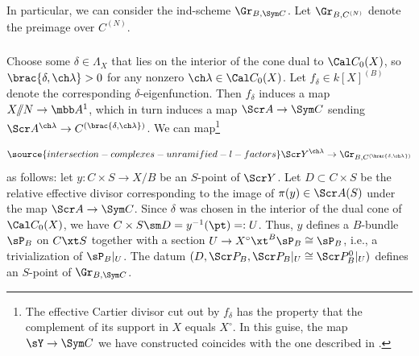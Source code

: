 In particular, we can consider the ind-scheme
$\Gr_{B,\Sym C}$. Let
$\Gr_{B,C^{(N)}}$ denote the preimage over $C^{(N)}$.

\subsubsection{} \label{sss:YGr}
Choose some $\delta \in \Lambda_X$ that lies on the interior of the
cone dual to $\Cal C_0(X)$, so $\brac{\delta,\ch\lambda}>0$
for any nonzero $\ch\lambda \in \Cal C_0(X)$.
Let $f_\delta \in k[X]^{(B)}$ denote the corresponding $\delta$-eigenfunction.
Then $f_\delta$ induces a map $X/\!\!/N \to \mbb A^1$, which
in turn induces a map $\Scr A \to \Sym C$ sending
$\Scr A^{\ch\lambda} \to C^{(\brac{\delta,\ch\lambda})}$.
We can map\footnote{
The effective Cartier divisor cut out by $f_\delta$
has the property that the complement of its support in $X$ equals $X^\circ$.
In this guise, the map $\sY \to \Sym C$ we have constructed coincides with
the one described in \cite[Remark 4.2.6]{Drinfeld}.}

\begin{equation} \label{e:YGr}
\source{intersection-complexes-unramified-l-factors}
    \Scr Y^{\ch\lambda} \to \Gr_{B,C^{(\brac{\delta,\ch\lambda})}}
\end{equation}
as follows:
let $y : C\times S \to X/B$ be an $S$-point of $\Scr Y$.
Let $D \subset C \times S$ be the relative effective divisor corresponding
to the image of $\pi(y)\in \Scr A(S)$ under the map $\Scr A \to \Sym C$.
Since $\delta$ was chosen in the interior of the dual cone of $\Cal C_0(X)$, we have
$C\times S \sm D = y^{-1}(\pt) =: U$.
Thus, $y$ defines a $B$-bundle $\sP_B$ on $C \xt S$ together with
a section $U \to X^\circ \xt^B \sP_B \cong \sP_B$, i.e., a trivialization of
$\sP_B|_U$.
The datum $(D, \Scr P_B, \Scr P_B|_U \cong \Scr P_B^0|_U)$ defines an $S$-point
of $\Gr_{B,\Sym C}$.


